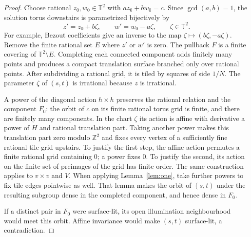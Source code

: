 \documentclass[11pt]{article}
\theoremstyle{remark}
\newcommand{\T}{\mathbb T}
\newcommand{\Z}{\mathbb Z}
\begin{document}
\begin{proof}
Choose rational $z_0,w_0\in\T^2$ with $az_0+bw_0=c$.
Since $\gcd(a,b)=1$, the solution torus downstairs is parametrized
bijectively by
\begin{equation}\label{eq:param}
 z'=z_0+b\zeta,\qquad w'=w_0-a\zeta,
 \qquad \zeta\in\T^2.
\end{equation}
For example, Bezout coefficients give an inverse to the map
$\zeta\mapsto(b\zeta,-a\zeta)$.
Remove the finite rational set $E$ where $z'$ or $w'$ is zero.
The pullback $F$ is a finite covering of $\T^2\setminus E$.
Completing each connected component adds finitely many points and produces
a compact translation surface branched only over rational points.
After subdividing a rational grid, it is tiled by squares of side $1/N$.
The parameter $\zeta$ of $(s,t)$ is irrational because $z$ is irrational.

A power of the diagonal action $h\times h$ preserves the rational relation
and the component $F_0$: the orbit of $c$ on its finite rational torus grid
is finite, and there are finitely many components. In the chart $\zeta$
its action is affine with derivative a power of $H$ and rational
translation part. Taking another power makes this translation part zero
modulo $\Z^2$ and fixes every vertex of a sufficiently fine rational tile
grid upstairs. To justify the first step, the affine action permutes a finite
rational grid containing $0$; a power fixes $0$. To justify the second,
its action on the finite set of preimages of the grid has finite order.
The same construction applies to $v\times v$ and $V$.
When applying Lemma~\ref{lem:one}, take further powers to fix tile edges
pointwise as well. That lemma makes the orbit of $(s,t)$ under the resulting
subgroup dense in the completed component, and hence dense in $F_0$.

If a distinct pair in $F_0$ were surface-lit, its open illumination
neighbourhood would meet this orbit. Affine invariance would make $(s,t)$
surface-lit, a contradiction.
\end{proof}
\end{document}
